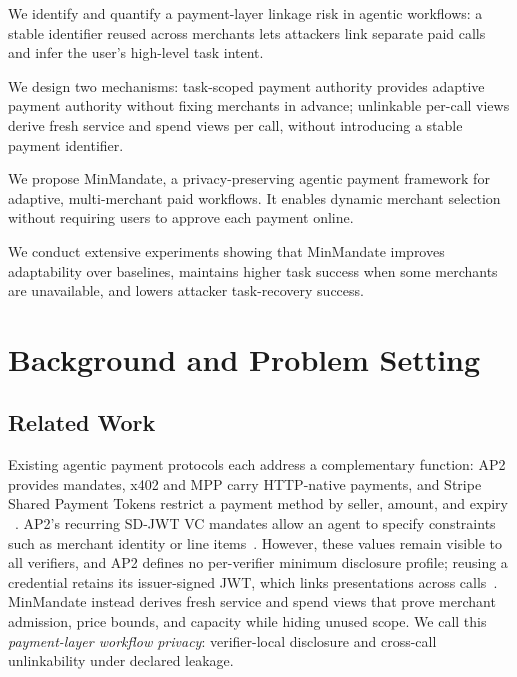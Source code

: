 \documentclass[letterpaper]{article}
\newcommand{\system}{MinMandate\xspace}
\begin{document}
\begin{mmcontributions}

\item We identify and quantify a payment-layer linkage risk in agentic workflows:
a stable identifier reused across merchants lets attackers link separate paid
calls and infer the user's high-level task intent.


\item We design two mechanisms: {task-scoped payment
authority} provides adaptive payment authority without fixing merchants in
advance; {unlinkable per-call views} derive fresh service and spend views per call, without introducing a stable payment identifier.

\item We propose \system, a privacy-preserving agentic payment framework for adaptive, multi-merchant paid workflows. It enables dynamic merchant selection
without requiring users to approve each payment online.

\item We conduct extensive experiments showing that \system improves adaptability
over baselines, maintains higher task success when some
merchants are unavailable, and lowers attacker task-recovery success.

\end{mmcontributions}



\section{Background and Problem Setting}
\label{sec:problem-statement}

\subsection{Related Work}
\label{sec:prelim-agent-payment}
\label{sec:related-work}

Existing agentic payment protocols each address a complementary function: AP2 provides
mandates, x402 and MPP carry HTTP-native payments, and Stripe Shared Payment
Tokens restrict a payment method by seller, amount, and expiry
~\cite{ap2docs,ap2blog,x402whitepaper,stripe2026mpp,stripe2026x402,
stripe2026spt}. AP2's recurring SD-JWT VC mandates allow an agent to
specify constraints such as merchant identity or line items~\cite{ap2docs,rfc9901}.
However, these values remain visible to all verifiers, and AP2 defines no
per-verifier minimum disclosure profile; reusing a credential retains its
issuer-signed JWT, which links presentations across calls~\cite{ap2docs,rfc9901}.
\system instead derives fresh service and spend views
that prove merchant admission, price bounds, and capacity while hiding
unused scope. We call this \emph{payment-layer workflow privacy}:
verifier-local disclosure and cross-call unlinkability under declared leakage.
\end{document}
